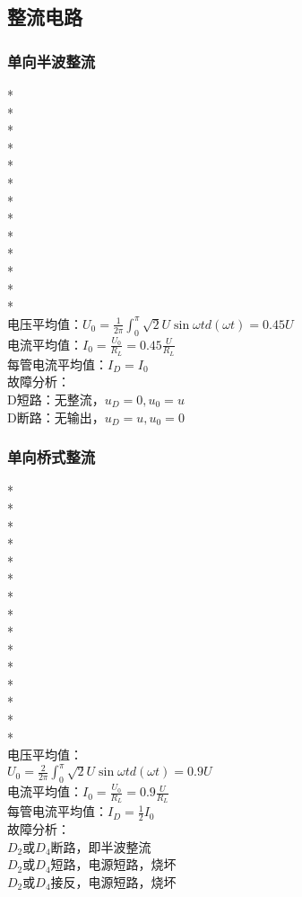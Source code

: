 \documentclass[UTF8, fontset=none]{ctexart}
\begin{document}
\begin{multicols*}{8}
\subsection{整流电路}
\subsubsection{单向半波整流}%
*\\
*\\
*\\
*\\
*\\
*\\
*\\
*\\
*\\
*\\
*\\
*\\
*\\
电压平均值：${U_0} = \frac{1}{{2\pi }}\int_0^\pi  {\sqrt 2 U\sin \omega td(\omega t) = 0.45U}$\\
电流平均值：${I_0} = \frac{{{U_0}}}{{{R_L}}} = 0.45\frac{U}{{{R_L}}}$\\
每管电流平均值：$I_D = I_0$\\
故障分析：\\
D短路：无整流，$u_D = 0, u_0 = u$\\
D断路：无输出，$u_D = u, u_0 = 0$\\

\subsubsection{单向桥式整流}%
*\\
*\\
*\\
*\\
*\\
*\\
*\\
*\\
*\\
*\\
*\\
*\\
*\\
*\\
*\\
电压平均值：\\
${U_0} = \frac{2}{{2\pi }}\int_0^\pi  {\sqrt 2 U\sin \omega td(\omega t) = 0.9U} $\\
电流平均值：${I_0} = \frac{{{U_0}}}{{{R_L}}} = 0.9\frac{U}{{{R_L}}}$\\
每管电流平均值：$I_D = \frac{1}{2}I_0$\\
故障分析：\\
$D_2$或$D_4$断路，即半波整流\\
$D_2$或$D_4$短路，电源短路，烧坏\\
$D_2$或$D_4$接反，电源短路，烧坏\\


\end{multicols*}
\end{document}
